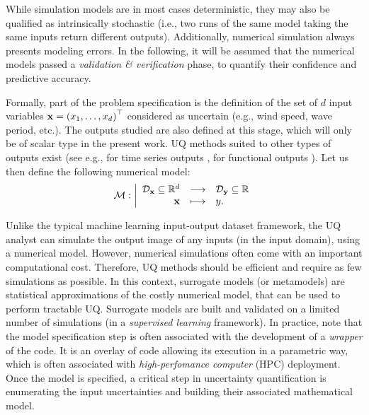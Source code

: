 While simulation models are in most cases deterministic, they may also be qualified as intrinsically stochastic (i.e., two runs of the same model taking the same inputs return different outputs).
Additionally, numerical simulation always presents modeling errors. 
In the following, it will be assumed that the numerical models passed a \textit{validation \& verification} phase, to quantify their confidence and predictive accuracy. 

Formally, part of the problem specification is the definition of the set of $d$ input variables ${\bf x} = \left(x_1, \dots, x_d\right)^\top$ considered as uncertain (e.g., wind speed, wave period, etc.). 
The outputs studied are also defined at this stage, which will only be of scalar type in the present work.  
UQ methods suited to other types of outputs exist (see e.g., for time series outputs \citet{lataniotis_2019}, for functional outputs \citet{auder_2012,rollon_2021}). 
Let us then define the following numerical model:
\begin{equation}
\mathcal{M} : \bigg|
    \begin{array}{rcl}
        \mathcal{D}_{{\bf x}} \subseteq \mathbb{R}^d & \longrightarrow & \mathcal{D}_{{\bf y}} \subseteq \mathbb{R} \\
        {\bf x} & \longmapsto & y.
    \end{array}
    \label{eq:numerical_model}
\end{equation}

Unlike the typical machine learning input-output dataset framework, the UQ analyst can simulate the output image of any inputs (in the input domain), using a numerical model. 
However, numerical simulations often come with an important computational cost. 
Therefore, UQ methods should be efficient and require as few simulations as possible. 
In this context, surrogate models (or metamodels) are statistical approximations of the costly numerical model, that can be used to perform tractable UQ. 
Surrogate models are built and validated on a limited number of simulations (in a \textit{supervised learning} framework). 
In practice, note that the model specification step is often associated with the development of a \textit{wrapper} of the code. 
It is an overlay of code allowing its execution in a parametric way, which is often associated with \textit{high-perfomance computer} (HPC) deployment.  
Once the model is specified, a critical step in uncertainty quantification is enumerating the input uncertainties and building their associated mathematical model.


